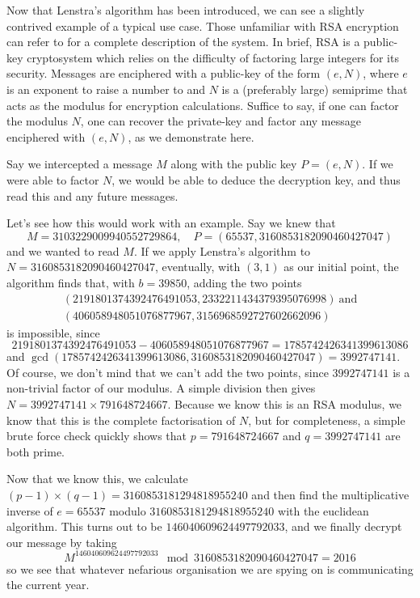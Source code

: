 
Now that Lenstra's algorithm has been introduced, we can see a slightly contrived example of a typical use case.
Those unfamiliar with RSA encryption can refer to \cite{menezes1996} for a complete description of the system.
In brief, RSA is a public-key cryptosystem which relies on the difficulty of factoring large integers for its security.
Messages are enciphered with a public-key of the form $(e,N)$, where $e$ is an exponent to raise a number to and $N$ is a (preferably large) semiprime that acts as the modulus for encryption calculations.
Suffice to say, if one can factor the modulus $N$, one can recover the private-key and factor any message enciphered with $(e,N)$, as we demonstrate here.

Say we intercepted a message $M$ along with the public key $P = (e,N)$.
If we were able to factor $N$, we would be able to deduce the decryption key, and thus read this and any future messages.

Let's see how this would work with an example.
Say we knew that
$$ M = 3103229009940552729864,\quad P = (65537, 3160853182090460427047) $$
and we wanted to read $M$.
If we apply Lenstra's algorithm to $N = 3160853182090460427047$, eventually, with $(3,1)$ as our initial point, the algorithm finds that, with $b = 39850$, adding the two points
\begin{align*}
(2191801374392476491053, 2332211434379395076998)\ \text{and}\\
(406058948051076877967, 3156968592727602662096)
\end{align*}
is impossible, since 
$$2191801374392476491053-406058948051076877967 = 1785742426341399613086$$ and $\gcd(1785742426341399613086, 3160853182090460427047) = 3992747141$.
Of course, we don't mind that we can't add the two points, since $3992747141$ is a non-trivial factor of our modulus.
A simple division then gives $N = 3992747141 \times 791648724667$.
Because we know this is an RSA modulus, we know that this is the complete factorisation of $N$, but for completeness, a simple brute force check quickly shows that $p = 791648724667$ and $q = 3992747141$ are both prime.

Now that we know this, we calculate $(p-1) \times (q-1) = 3160853181294818955240$ and then find the multiplicative inverse of $e = 65537$ modulo $3160853181294818955240$ with the euclidean algorithm.
This turns out to be $146040609624497792033$, and we finally decrypt our message by taking
$$ M^{146040609624497792033} \mod 3160853182090460427047 =2016 $$
so we see that whatever nefarious organisation we are spying on is communicating the current year.

